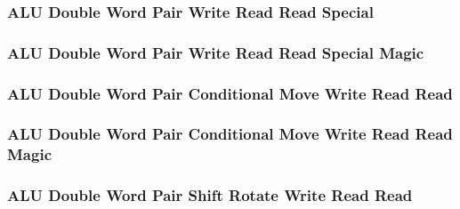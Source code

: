 

\subsubsection[{\small ALU Double Word Pair Write Read Read Special}]{ALU Double Word Pair Write Read Read Special} \label{sec:format-ALU-DPWRRS}



\subsubsection[{\small ALU Double Word Pair Write Read Read Special Magic}]{ALU Double Word Pair Write Read Read Special Magic} \label{sec:format-ALU-DPWRRS.M}



\subsubsection[{\small ALU Double Word Pair Conditional Move Write Read Read}]{ALU Double Word Pair Conditional Move Write Read Read} \label{sec:format-ALU-DPCMWRR}



\subsubsection[{\small ALU Double Word Pair Conditional Move Write Read Read Magic}]{ALU Double Word Pair Conditional Move Write Read Read Magic} \label{sec:format-ALU-DPCMWRR.M}



\subsubsection[{\small ALU Double Word Pair Shift Rotate Write Read Read}]{ALU Double Word Pair Shift Rotate Write Read Read} \label{sec:format-ALU-DPSWRR}

